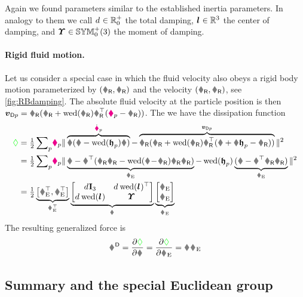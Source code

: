 Again we found parameters similar to the established inertia parameters.
In analogy to them we call $\bodyDamping{}{}\in\RealNumSP$ the total damping, $\bodyCOD{}{}\in\RealNum^3$ the center of damping, and $\bodyMOD{}{}\in\SymMatSP(3)$ the moment of damping.

\paragraph{Rigid fluid motion.}
Let us consider a special case in which the fluid velocity also obeys a rigid body motion parameterized by $(\rR,\RR)$ and the velocity $(\vR,\wR)$, see \autoref{fig:RBdamping}.
The absolute fluid velocity at the particle position is then $\tuple{v}_{\mathsf{D}\PidxI} = \RR(\vR + \wedOp(\wR)\RR^\top(\particlePos{\PidxI} - \rR))$.
The we have the dissipation function
\begin{align}\label{eq:RBDissFkt}
 \dissFkt &= \tfrac{1}{2} \sumParticles \!\particleDamping{\PidxI} \norm{\overbrace{\R(\v - \wedOp(\particleBodyPos{\PidxI})\w)}^{\particlePosd{\PidxI}} - \overbrace{\RR(\vR + \wedOp(\wR)\RR^\top(\r + \R\particleBodyPos{\PidxI} - \rR))}^{\tuple{v}_{\mathsf{D}\PidxI}}}^2
\nonumber\\
 &= \tfrac{1}{2} \sumParticles \!\particleDamping{\PidxI} \norm{\underbrace{\v - \R^\top(\RR\vR - \wedOp(\r \!-\! \rR)\RR\wR)}_{\vE} - \wedOp(\particleBodyPos{\PidxI})\underbrace{(\w - \R^\top\RR\wR)}_{\wE}}^2
\nonumber\\
 &= \tfrac{1}{2} 
 \underbrace{\big[ \vE^\top, \wE^\top \big]}_{\bodyVelE{}{}^\top }
 \underbrace{\begin{bmatrix} \bodyDamping{}{}\idMat[3] & \bodyDamping{}{} \wedOp(\bodyCOD{}{})^\top \\ \bodyDamping{}{} \wedOp(\bodyCOD{}{}) & \bodyMOD{}{} \end{bmatrix}}_{\bodyDissMat{}{}}
 \underbrace{\begin{bmatrix} \vE \\ \wE \end{bmatrix}}_{\bodyVelE{}{}}
\end{align}
The resulting generalized force is 
\begin{align}
 \bodyGenForceDiss{}{} = \pdiff[\dissFkt]{\bodyVel{}{}} = \pdiff[\dissFkt]{\bodyVelE{}{}} = \bodyDissMat{}{} \bodyVelE{}{}
\end{align}


\subsection{Summary and the special Euclidean group}

